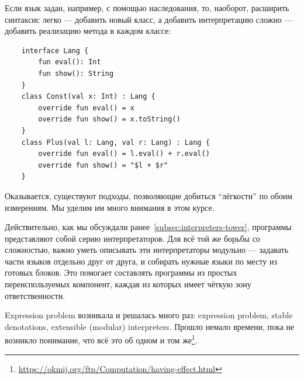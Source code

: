 Если язык задан, например, с помощью наследования, то, наоборот, расширить синтаксис легко --- добавить новый класс, а добавить интерпретацию сложно --- добавить реализацию метода в каждом классе:
\begin{verbatim}
    interface Lang {
        fun eval(): Int
        fun show(): String
    }
    class Const(val x: Int) : Lang {
        override fun eval() = x
        override fun show() = x.toString()
    }
    class Plus(val l: Lang, val r: Lang) : Lang {
        override fun eval() = l.eval() + r.eval()
        override fun show() = "$l + $r"
    }
\end{verbatim}

Оказывается, существуют подходы, позволяющие добиться ``лёгкости'' по обоим измерениям.
Мы уделим им много внимания в этом курсе.

Действительно, как мы обсуждали ранее~\ref{subsec:interpreters-tower}, программы представляют собой серию интерпретаторов.
Для всё той же борьбы со сложностью, важно уметь описывать эти интерпретаторы модульно --- задавать части языков отдельно друг от друга, и собирать нужные языки по месту из готовых блоков.
Это помогает составлять программы из простых переиспользуемых компонент, каждая из которых имеет чёткую зону ответственности.

Expression problem возникала и решалась много раз: expression problem, stable denotations, extensible (modular) interpreters.
Прошло немало времени, пока не возникло понимание, что всё это об одном и том же\footnote{\url{https://okmij.org/ftp/Computation/having-effect.html}}.


